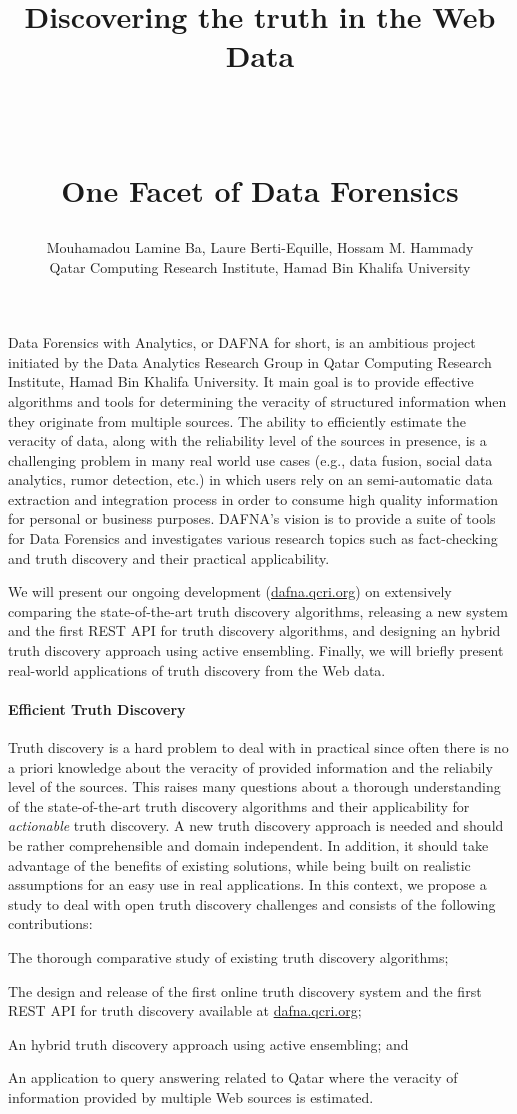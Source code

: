 \documentclass[paper=a4, fontsize=11pt]{scrartcl}	%
\title{ \vspace{-1in} 	\usefont{OT1}{bch}{b}{n}
		\huge \strut Discovering the truth in the Web Data\strut \\
		\Large \bfseries \strut One Facet of Data Forensics\strut
}
\author{ 									\usefont{OT1}{bch}{m}{n}
        Mouhamadou Lamine Ba, Laure Berti-Equille, Hossam M. Hammady\\		\usefont{OT1}{bch}{m}{n}
        Qatar Computing Research Institute, Hamad Bin Khalifa University\\	\usefont{OT1}{bch}{m}{n}
}
\date{}
\numberwithin{equation}{section}															%
\numberwithin{figure}{section}																%
\numberwithin{table}{section}																%
\begin{document}
\maketitle
 \vspace*{-1.5cm}
 Data Forensics with Analytics, or DAFNA for short, is an ambitious project initiated by the Data Analytics Research Group in Qatar Computing Research
 Institute, Hamad Bin Khalifa University. It main goal is to provide effective algorithms and tools for determining the veracity of structured information when they originate
 from  multiple sources. The ability to efficiently estimate the veracity of data, along with the reliability level of the sources in presence, is a challenging
 problem in many real world use cases (e.g., data fusion, social data analytics, rumor detection, etc.) in which users rely on an semi-automatic data extraction
 and integration process in order to consume high quality information for personal or business purposes. DAFNA's vision is to provide a suite of tools for Data
 Forensics and investigates various research topics such as fact-checking and truth discovery and their practical applicability.

We will present our ongoing development (\url{dafna.qcri.org}) on extensively comparing the state-of-the-art truth discovery algorithms, releasing a new system and 
the first REST API for truth discovery algorithms, and designing an hybrid truth discovery approach using active ensembling. Finally, we will briefly present real-world
applications of truth discovery from the Web data.
 
 \paragraph*{Efficient Truth Discovery}Truth discovery is a hard problem to deal with in practical since often there is no a priori knowledge about the veracity of provided 
 information and the reliabily level of the sources. This raises many questions about a thorough understanding of the state-of-the-art truth discovery algorithms and their applicability
 for \emph{actionable} truth discovery. A new truth discovery approach is needed and should be rather comprehensible and domain independent. In addition, it should take advantage of the 
 benefits of existing solutions, while being built on realistic assumptions for an easy use in real applications. In this context, we propose a study to deal with open truth discovery challenges 
 and consists of the following contributions:
 \begin{inparaenum}[(i)]
  \item The thorough comparative study of existing truth discovery algorithms;
  \item The design and release of the first online truth discovery system and 
  the first REST API for truth discovery available at \url{dafna.qcri.org};
  \item An hybrid truth discovery approach using active ensembling; and 
  \item An application to query answering related to Qatar where the veracity of information provided by multiple Web sources is estimated.
 \end{inparaenum}
 \cite{*}
 
 
\end{document}
